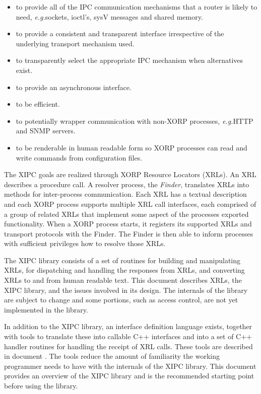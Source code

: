 \documentclass[11pt]{article}
\newcommand{\eg}{\emph{e.g.\/}} %
\begin{document}
\begin{itemize}

\item to provide all of the IPC communication mechanisms that a router is
likely to need, \eg sockets, ioctl's, sysV messages and shared memory.

\item to provide a consistent and transparent interface irrespective
of the underlying transport mechanism used.

\item to transparently select the appropriate IPC mechanism when
alternatives exist.

\item to provide an asynchronous interface.

\item to be efficient.

\item to potentially wrapper communication with non-XORP processes,
\eg HTTP and SNMP servers.

\item to be renderable in human readable form so XORP processes can
read and write commands from configuration files.

\end{itemize}

The XIPC goals are realized through XORP Resource Locators (XRLs).  An
XRL describes a procedure call.  A resolver process, the
\emph{Finder}, translates XRLs into methods for inter-process
communication.  Each XRL has a textual description and each XORP
process supports multiple XRL call interfaces, each comprised of a
group of related XRLs that implement some aspect of the processes
exported functionality.  When a XORP process starts, it registers its
supported XRLs and transport protocols with the Finder.  The Finder is
then able to inform processes with sufficient privileges how to
resolve those XRLs.

The XIPC library consists of a set of routines for building and
manipulating XRLs, for dispatching and handling the responses from
XRLs, and converting XRLs to and from human readable text.  This
document describes XRLs, the XIPC library, and the issues involved in
its design.  The internals of the library are subject to change and
some portions, such as access control, are not yet implemented in the
library.

In addition to the XIPC library, an interface definition language
exists, together with tools to translate these into callable C++ interfaces and
into a set of C++ handler routines for handling the receipt of XRL
calls.  These tools are described in document \cite{xorp:xrl_interfaces}.
The tools reduce 
the amount of familiarity the working programmer needs to have with the
internals of the XIPC library.  This document provides an overview of
the XIPC library and is the recommended starting point before using
the library.
\end{document}
